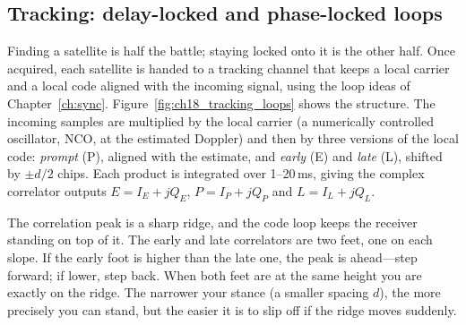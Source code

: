 \subsection{Tracking: delay-locked and phase-locked loops}
\label{sec:ch18:tracking}

Finding a satellite is half the battle; staying locked onto it is the other half. Once acquired,
each satellite is handed to a tracking channel that keeps a local carrier and a local code aligned
with the incoming signal, using the loop ideas of Chapter~\ref{ch:sync}.
Figure~\ref{fig:ch18_tracking_loops} shows the structure. The incoming samples are multiplied by
the local carrier (a numerically controlled oscillator, NCO, at the estimated Doppler) and then by
three versions of the local code: \emph{prompt} (P), aligned with the estimate, and \emph{early}
(E) and \emph{late} (L), shifted by $\pm d/2$ chips. Each product is integrated over 1--20\,ms,
giving the complex correlator outputs $E=I_E+jQ_E$, $P=I_P+jQ_P$ and $L=I_L+jQ_L$.


\begin{analogy}
The correlation peak is a sharp ridge, and the code loop keeps the receiver standing on top of
it. The early and late correlators are two feet, one on each slope. If the early foot is higher
than the late one, the peak is ahead---step forward; if lower, step back. When both feet are at the
same height you are exactly on the ridge. The narrower your stance (a smaller spacing $d$), the more
precisely you can stand, but the easier it is to slip off if the ridge moves suddenly.
\end{analogy}

